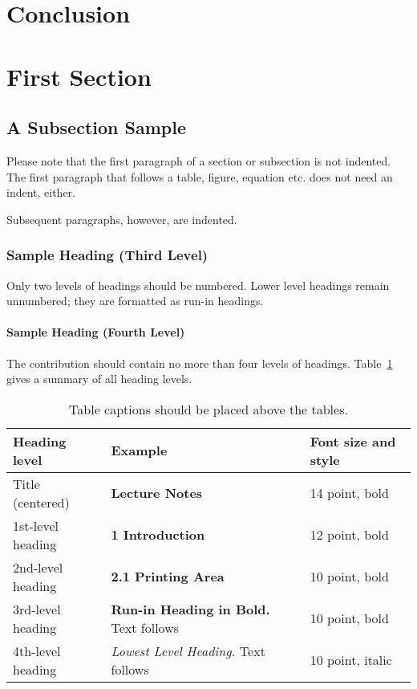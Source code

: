 \documentclass[runningheads]{llncs}
\begin{document}
\section{Conclusion}
\label{ch:conclusion}



\section{First Section}
\subsection{A Subsection Sample}
Please note that the first paragraph of a section or subsection is
not indented. The first paragraph that follows a table, figure,
equation etc. does not need an indent, either.

Subsequent paragraphs, however, are indented.

\subsubsection{Sample Heading (Third Level)} Only two levels of
headings should be numbered. Lower level headings remain unnumbered;
they are formatted as run-in headings.

\paragraph{Sample Heading (Fourth Level)}
The contribution should contain no more than four levels of
headings. Table~\ref{tab1} gives a summary of all heading levels.

\begin{table}
\caption{Table captions should be placed above the
tables.}\label{tab1}
\begin{tabular}{|l|l|l|}
\hline
Heading level &  Example & Font size and style\\
\hline
Title (centered) &  {\Large\bfseries Lecture Notes} & 14 point, bold\\
1st-level heading &  {\large\bfseries 1 Introduction} & 12 point, bold\\
2nd-level heading & {\bfseries 2.1 Printing Area} & 10 point, bold\\
3rd-level heading & {\bfseries Run-in Heading in Bold.} Text follows & 10 point, bold\\
4th-level heading & {\itshape Lowest Level Heading.} Text follows & 10 point, italic\\
\hline
\end{tabular}
\end{table}
\end{document}
